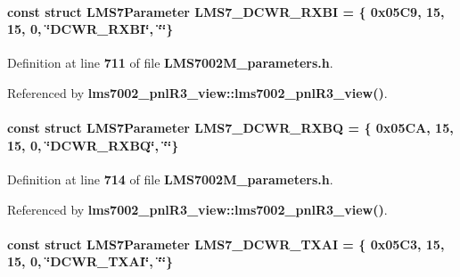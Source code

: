 \paragraph[{L\+M\+S7\+\_\+\+D\+C\+W\+R\+\_\+\+R\+X\+BI}]{\setlength{\rightskip}{0pt plus 5cm}const struct {\bf L\+M\+S7\+Parameter} L\+M\+S7\+\_\+\+D\+C\+W\+R\+\_\+\+R\+X\+BI = \{ 0x05\+C9, 15, 15, 0, \char`\"{}\+D\+C\+W\+R\+\_\+\+R\+X\+B\+I\char`\"{}, \char`\"{}\char`\"{}\}\hspace{0.3cm}{\ttfamily [static]}}\label{LMS7002M__parameters_8h_a6857313a525af98b4c6d10ada60cf44e}


Definition at line {\bf 711} of file {\bf L\+M\+S7002\+M\+\_\+parameters.\+h}.



Referenced by {\bf lms7002\+\_\+pnl\+R3\+\_\+view\+::lms7002\+\_\+pnl\+R3\+\_\+view()}.

\paragraph[{L\+M\+S7\+\_\+\+D\+C\+W\+R\+\_\+\+R\+X\+BQ}]{\setlength{\rightskip}{0pt plus 5cm}const struct {\bf L\+M\+S7\+Parameter} L\+M\+S7\+\_\+\+D\+C\+W\+R\+\_\+\+R\+X\+BQ = \{ 0x05\+C\+A, 15, 15, 0, \char`\"{}\+D\+C\+W\+R\+\_\+\+R\+X\+B\+Q\char`\"{}, \char`\"{}\char`\"{}\}\hspace{0.3cm}{\ttfamily [static]}}\label{LMS7002M__parameters_8h_a94b0420a45baf1ddbe86775154ec0f9d}


Definition at line {\bf 714} of file {\bf L\+M\+S7002\+M\+\_\+parameters.\+h}.



Referenced by {\bf lms7002\+\_\+pnl\+R3\+\_\+view\+::lms7002\+\_\+pnl\+R3\+\_\+view()}.

\paragraph[{L\+M\+S7\+\_\+\+D\+C\+W\+R\+\_\+\+T\+X\+AI}]{\setlength{\rightskip}{0pt plus 5cm}const struct {\bf L\+M\+S7\+Parameter} L\+M\+S7\+\_\+\+D\+C\+W\+R\+\_\+\+T\+X\+AI = \{ 0x05\+C3, 15, 15, 0, \char`\"{}\+D\+C\+W\+R\+\_\+\+T\+X\+A\+I\char`\"{}, \char`\"{}\char`\"{}\}\hspace{0.3cm}{\ttfamily [static]}}\label{LMS7002M__parameters_8h_a2af99cacfa67b65a8ce00fd1705736f5}


